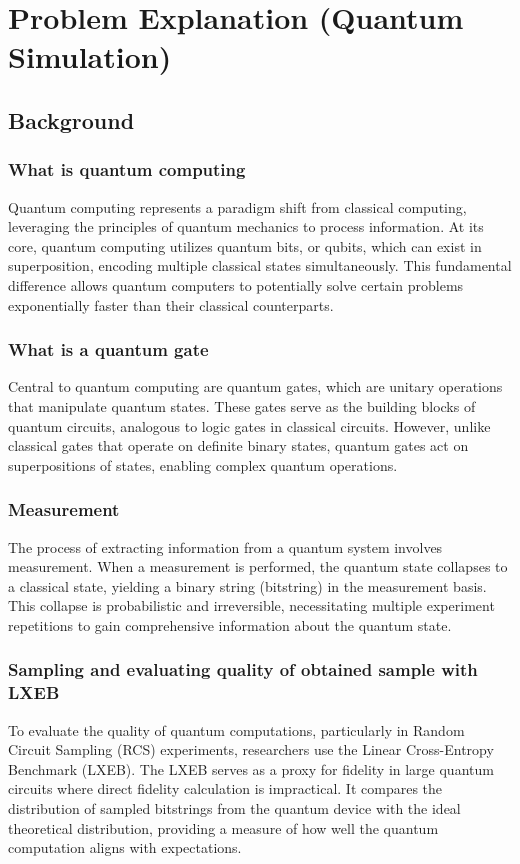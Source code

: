 \documentclass[12pt,oneside,a4paper]{article}
\begin{document}
\section{Problem Explanation (Quantum Simulation)}

\subsection{Background}

\subsubsection{What is quantum computing}
Quantum computing represents a paradigm shift from classical computing, leveraging the principles of quantum mechanics to process information. At its core, quantum computing utilizes quantum bits, or qubits, which can exist in superposition, encoding multiple classical states simultaneously. This fundamental difference allows quantum computers to potentially solve certain problems exponentially faster than their classical counterparts.

\subsubsection{What is a quantum gate}
Central to quantum computing are quantum gates, which are unitary operations that manipulate quantum states. These gates serve as the building blocks of quantum circuits, analogous to logic gates in classical circuits. However, unlike classical gates that operate on definite binary states, quantum gates act on superpositions of states, enabling complex quantum operations.

\subsubsection{Measurement}
The process of extracting information from a quantum system involves measurement. When a measurement is performed, the quantum state collapses to a classical state, yielding a binary string (bitstring) in the measurement basis. This collapse is probabilistic and irreversible, necessitating multiple experiment repetitions to gain comprehensive information about the quantum state.

\subsubsection{Sampling and evaluating quality of obtained sample with LXEB}
To evaluate the quality of quantum computations, particularly in Random Circuit Sampling (RCS) experiments, researchers use the Linear Cross-Entropy Benchmark (LXEB). The LXEB serves as a proxy for fidelity in large quantum circuits where direct fidelity calculation is impractical. It compares the distribution of sampled bitstrings from the quantum device with the ideal theoretical distribution, providing a measure of how well the quantum computation aligns with expectations.
\end{document}
